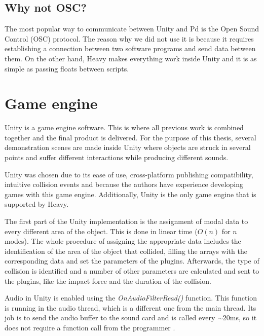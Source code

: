 \subsection{Why not OSC?}
The most popular way to communicate between Unity\textsuperscript{\textregistered} and \gls{Pd} is the Open Sound Control (OSC) protocol. The reason why we did not use it is because it requires establishing a connection between two software programs and send data between them. On the other hand, Heavy makes everything work inside Unity\textsuperscript{\textregistered} and it is as simple as passing floats between scripts. 

\section{Game engine}
Unity\textsuperscript{\textregistered} is a game engine software. This is where all previous work is combined together and the final product is delivered. For the purpose of this thesis, several demonstration scenes are made inside Unity\textsuperscript{\textregistered} where objects are struck in several points and suffer different interactions while producing different sounds. 

Unity\textsuperscript{\textregistered} was chosen due to its ease of use, cross-platform publishing compatibility, intuitive collision events and because the authors have experience developing games with this game engine. Additionally, Unity\textsuperscript{\textregistered} is the only game engine that is supported by Heavy.

The first part of the Unity\textsuperscript{\textregistered} implementation is the assignment of modal data to every different area of the object. This is done in linear time ($O(n)$ for $n$ modes). The whole procedure of assigning the appropriate data includes the identification of the area of the object that collided, filling the arrays with the corresponding data and set the parameters of the plugins. Afterwards, the type of collision is identified and a number of other parameters are calculated and sent to the plugins, like the impact force and the duration of the collision.

Audio in Unity\textsuperscript{\textregistered} is enabled using the \textit{OnAudioFilterRead()} function. This function is running in the audio thread, which is a different one from the main thread. Its job is to send the audio buffer to the sound card and is called every $\sim 20$ms, so it does not require a function call from the programmer \cite{bib:unity_doc}.

